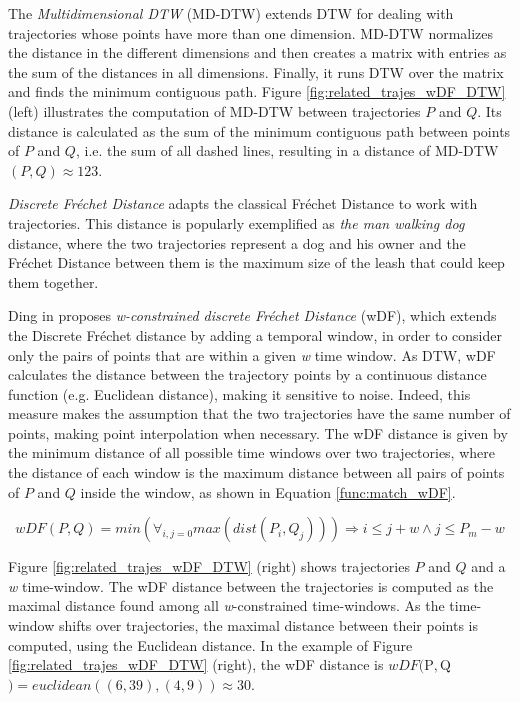 The \emph{Multidimensional DTW} (MD-DTW) \cite{ten2007multi} extends DTW for dealing with trajectories whose points have more than one dimension. MD-DTW normalizes the distance in the different dimensions and then creates a matrix with entries as the sum of the distances in all dimensions. Finally, it runs DTW over the matrix and finds the minimum contiguous path. Figure \ref{fig:related_trajes_wDF_DTW} (left) illustrates the computation of MD-DTW between trajectories $P$ and $Q$. Its distance is calculated as the sum of the minimum contiguous path between points of $P$ and $Q$, i.e. the sum of all dashed lines, resulting in a distance of MD-DTW$(P, Q) \approx 123$.

\emph{Discrete Fr{\'e}chet Distance} \cite{eiter1994computing} adapts the classical Fr{\'e}chet Distance \cite{Frechet1906} to work with trajectories. This distance is popularly exemplified as \textit{the man walking dog} distance, where the two trajectories represent a dog and his owner and the Fr{\'e}chet Distance between them is the maximum size of the leash that could keep them together.

Ding in \cite{Ding:2008:ESJ:1440463.1440989} proposes \emph{w-constrained discrete Fr{\'e}chet Distance} (wDF), which extends the Discrete Fr{\'e}chet distance \cite{eiter1994computing} by adding a temporal window, in order to consider only the pairs of points that are within a given \emph{w} time window. {As DTW, wDF calculates the distance between the trajectory points by a continuous distance function (e.g. Euclidean distance), making it sensitive to noise}. Indeed, this measure makes the assumption that the two trajectories have the same number of points, making point interpolation when necessary. The wDF distance is given by the minimum distance of all possible time windows over two trajectories, where the distance of each window is the maximum distance between all pairs of points of $P$ and $Q$ inside the window, as shown in Equation \ref{func:match_wDF}.

\begin{equation}
\label{func:match_wDF}
  wDF(P, Q) = min(\forall_{i,j=0}max(dist(P_i, Q_j))) \Rightarrow i \leq j + w \land
  j \leq P_{m} - w
\end{equation}

Figure \ref{fig:related_trajes_wDF_DTW} (right) shows trajectories $P$ and $Q$ and a \emph{w} time-window. The wDF distance between the trajectories is computed as the maximal distance found among all \emph{w}-constrained time-windows. As the time-window shifts over trajectories, the maximal distance between their points is computed, using the Euclidean distance. In the example of Figure \ref{fig:related_trajes_wDF_DTW} (right), the wDF distance is $wDF($P$, $Q$) = euclidean((6,39), (4,9)) \approx 30$.

